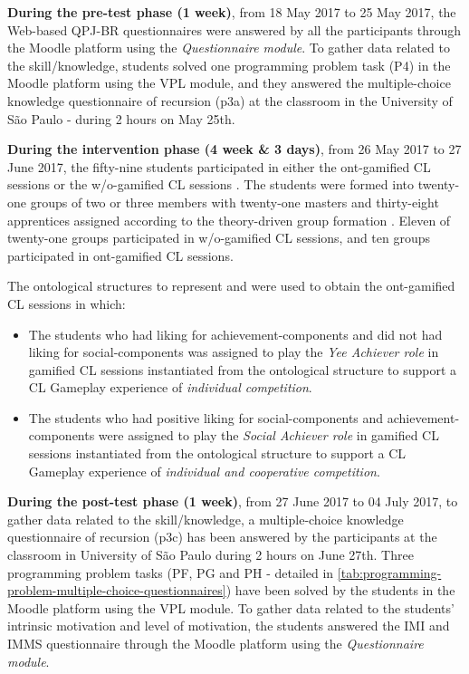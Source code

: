\textbf{During the pre-test phase (1 week)}, from 18 May 2017 to 25 May 2017, the Web-based QPJ-BR questionnaires were answered by all the participants through the Moodle platform using the \emph{Questionnaire module}.
To gather data related to the skill/knowledge, students solved one programming problem task (P4) in the Moodle platform using the VPL module, and they answered the multiple-choice knowledge questionnaire of recursion (p3a) at the classroom in the University of São Paulo - during 2 hours on May 25th.

\textbf{During the intervention phase (4 week \& 3 days)}, from 26 May 2017 to 27 June 2017, the fifty-nine students participated in either the ont-gamified CL sessions or the w/o-gamified CL sessions .
The students were formed into twenty-one groups of two or three members with twenty-one masters and thirty-eight apprentices assigned according to the theory-driven group formation \cite{IsotaniMizoguchi2008a}.
Eleven of twenty-one groups participated in w/o-gamified CL sessions, and ten groups participated in ont-gamified CL sessions.

The ontological structures to represent  and  were used to obtain the ont-gamified CL sessions in which:
\begin{itemize}
\item The students who had liking for achievement-components and did not had liking for social-components was assigned to play the \emph{Yee Achiever role} in gamified CL sessions instantiated from the ontological structure  to support a CL Gameplay experience of \emph{individual competition}.
\item The students who had positive liking for social-components and achievement-components were assigned to play the \emph{Social Achiever role} in gamified CL sessions instantiated from the ontological structure  to support a CL Gameplay experience of \emph{individual and cooperative competition}.
\end{itemize}

\textbf{During the post-test phase (1 week)}, from 27 June 2017 to 04 July 2017, to gather data related to the skill/knowledge, a multiple-choice knowledge questionnaire of recursion (p3c) has been answered by the participants at the classroom in University of São Paulo during 2 hours on June 27th. Three programming problem tasks (PF, PG and PH - detailed in \autoref{tab:programming-problem-multiple-choice-questionnaires}) have been solved by the students in the Moodle platform using the VPL module.
To gather data related to the students' intrinsic motivation and level of motivation, the students answered the IMI and IMMS questionnaire through the Moodle platform using the \emph{Questionnaire module}.

